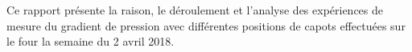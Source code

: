 
Ce rapport présente la raison, le déroulement et l'analyse des expériences de mesure du gradient de pression avec différentes positions de capots effectuées sur le four la semaine du 2 avril 2018.